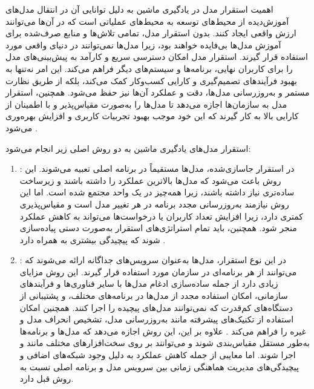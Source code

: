 اهمیت استقرار مدل در یادگیری ماشین به دلیل توانایی آن در انتقال مدل‌های آموزش‌دیده از محیط‌های توسعه به محیط‌های عملیاتی است که در آن‌ها می‌توانند ارزش واقعی ایجاد کنند. بدون استقرار مدل، تمامی تلاش‌ها و منابع صرف‌شده برای آموزش مدل‌ها بی‌فایده خواهند بود، زیرا مدل‌ها نمی‌توانند در دنیای واقعی مورد استفاده قرار گیرند. استقرار مدل امکان دسترسی سریع و کارآمد به پیش‌بینی‌های مدل را برای کاربران نهایی، برنامه‌ها و سیستم‌های دیگر فراهم می‌کند. این امر نه‌تنها به بهبود فرآیندهای تصمیم‌گیری و کارایی کسب‌وکار کمک می‌کند، بلکه از طریق نظارت مستمر و به‌روزرسانی مدل‌ها، دقت و عملکرد آن‌ها نیز حفظ می‌شود. همچنین، استقرار مدل به سازمان‌ها اجازه می‌دهد تا مدل‌ها را به‌صورت مقیاس‌پذیر و با اطمینان از کارایی بالا به کار گیرند که این خود موجب بهبود تجربیات کاربری و افزایش بهره‌وری می‌شود \cite{kubeflowforML}.

استقرار مدل‌های یادگیری ماشین به دو روش اصلی زیر انجام می‌شود: 

\begin{enumerate}
	\item
	:
	در استقرار جاسازی‌شده، مدل‌ها مستقیماً در برنامه اصلی تعبیه می‌شوند. این روش باعث می‌شود که مدل‌ها بالاترین عملکرد را داشته باشند و زیرساخت ساده‌تری نیاز داشته باشند، زیرا همه‌چیز در یک واحد مجتمع شده است. اما این روش نیازمند به‌روزرسانی مجدد برنامه در هر تغییر مدل است و مقیاس‌پذیری کمتری دارد، زیرا افزایش تعداد کاربران یا درخواست‌ها می‌تواند به کاهش عملکرد منجر شود. همچنین، باید تمام استراتژی‌های استقرار به‌صورت دستی پیاده‌سازی شوند که پیچیدگی بیشتری به همراه دارد \cite{kubeflowforML}.
	\item 
	:
	در این نوع استقرار، مدل‌ها به‌عنوان سرویس‌های جداگانه ارائه می‌شوند که می‌توانند از هر برنامه‌ای در سازمان مورد استفاده قرار گیرند. این روش مزایای زیادی دارد از جمله ساده‌سازی ادغام مدل‌ها با سایر فناوری‌ها و فرآیندهای سازمانی، امکان استفاده مجدد از مدل‌ها در برنامه‌های مختلف، و پشتیبانی از دستگاه‌های کم‌قدرت که نمی‌توانند مدل‌های پیچیده را اجرا کنند.  همچنین امکان استفاده از تکنیک‌های پیشرفته مانند به‌روزرسانی مدل، تشخیص انحراف مدل و غیره را فراهم می‌کند \cite{kubeflowforML}. علاوه بر این، این روش اجازه می‌دهد که مدل‌ها و برنامه‌ها به‌طور مستقل مقیاس‌بندی شوند و می‌توانند بر روی سخت‌افزارهای مختلف مانند  و  اجرا شوند. اما معایبی از جمله کاهش عملکرد به دلیل وجود شبکه‌های اضافی و پیچیدگی‌های مدیریت هماهنگی زمانی بین سرویس مدل و برنامه اصلی نسبت به روش قبل دارد.
\end{enumerate}

